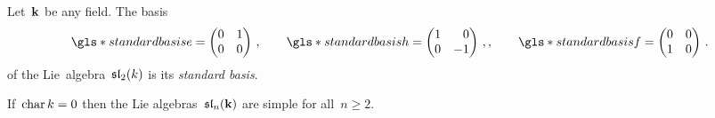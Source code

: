 \begin{definition}
 Let~$\mathbf{k}$ be any field.
 The basis
 \[
    \gls*{standard basis e}
    =
    \begin{pmatrix}
      0 & 1 \\
      0 & 0
    \end{pmatrix} \,,
    \qquad
    \gls*{standard basis h}
    =
    \begin{pmatrix*}[r]
      1 &  0  \\
      0 & -1
    \end{pmatrix*}  \,,,
    \qquad
    \gls*{standard basis f}
    =
    \begin{pmatrix}
      0 & 0 \\
      1 & 0
    \end{pmatrix} \,.
  \]
  of the Lie~algebra~$\mathfrak{sl}_2(k)$ is its \emph{standard basis}.
\end{definition}


\begin{remark}
 If~$\operatorname{char} k = 0$ then the Lie algebras~$\mathfrak{sl}_n(\mathbf{k})$ are simple for all~$n \geq 2$.
\end{remark}




